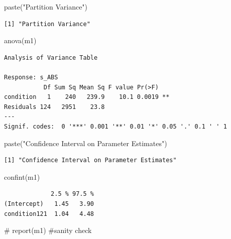 \documentclass[
  letterpaper,
  DIV=11,
  numbers=noendperiod]{scrreprt}
\newenvironment{Shaded}{\begin{snugshade}}{\end{snugshade}}
\newcommand{\CommentTok}[1]{\textcolor[rgb]{0.37,0.37,0.37}{#1}}
\newcommand{\FunctionTok}[1]{\textcolor[rgb]{0.28,0.35,0.67}{#1}}
\newcommand{\NormalTok}[1]{\textcolor[rgb]{0.00,0.23,0.31}{#1}}
\newcommand{\StringTok}[1]{\textcolor[rgb]{0.13,0.47,0.30}{#1}}
\begin{document}
\begin{Shaded}
\begin{Highlighting}[]
\FunctionTok{paste}\NormalTok{(}\StringTok{"Partition Variance"}\NormalTok{)}
\end{Highlighting}
\end{Shaded}

\begin{verbatim}
[1] "Partition Variance"
\end{verbatim}

\begin{Shaded}
\begin{Highlighting}[]
\FunctionTok{anova}\NormalTok{(m1)}
\end{Highlighting}
\end{Shaded}

\begin{verbatim}
Analysis of Variance Table

Response: s_ABS
           Df Sum Sq Mean Sq F value Pr(>F)   
condition   1    240   239.9    10.1 0.0019 **
Residuals 124   2951    23.8                  
---
Signif. codes:  0 '***' 0.001 '**' 0.01 '*' 0.05 '.' 0.1 ' ' 1
\end{verbatim}

\begin{Shaded}
\begin{Highlighting}[]
\FunctionTok{paste}\NormalTok{(}\StringTok{"Confidence Interval on Parameter Estimates"}\NormalTok{)}
\end{Highlighting}
\end{Shaded}

\begin{verbatim}
[1] "Confidence Interval on Parameter Estimates"
\end{verbatim}

\begin{Shaded}
\begin{Highlighting}[]
\FunctionTok{confint}\NormalTok{(m1)}
\end{Highlighting}
\end{Shaded}

\begin{verbatim}
             2.5 % 97.5 %
(Intercept)   1.45   3.90
condition121  1.04   4.48
\end{verbatim}

\begin{Shaded}
\begin{Highlighting}[]
\CommentTok{\# report(m1) \#sanity check}
\end{Highlighting}
\end{Shaded}
\end{document}
